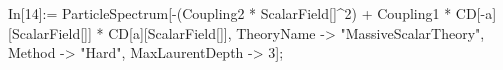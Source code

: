 In[14]:= ParticleSpectrum[-(Coupling2 * ScalarField[]^2) + Coupling1 * CD[-a][ScalarField[]] * CD[a][ScalarField[]], TheoryName -> "MassiveScalarTheory", Method -> "Hard", MaxLaurentDepth -> 3]; 